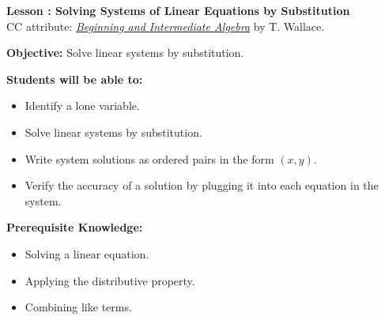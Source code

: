 \documentclass[12pt]{article}
\theoremstyle{definition}
\begin{document}
{\bf \large Lesson : Solving Systems of Linear Equations by Substitution}\label{les:substitution}\\
CC attribute: \href{http://www.wallace.ccfaculty.org/book/book.html}{\it{Beginning and Intermediate Algebra}} by T. Wallace. \hfill \doclicenseImage[imagewidth=5em]\\
\par
{\bf Objective:} Solve linear systems by substitution.\\
\par
{\bf Students will be able to:}
\begin{itemize}
	\item Identify a lone variable.
	\item Solve linear systems by substitution.
	\item Write system solutions as ordered pairs in the form $(x,y)$.
	\item Verify the accuracy of a solution by plugging it into each equation in the system.
\end{itemize}
{\bf Prerequisite Knowledge:}
\begin{itemize}
	\item Solving a linear equation.
	\item Applying the distributive property.
	\item Combining like terms.
\end{itemize}
\hrulefill
\end{document}
